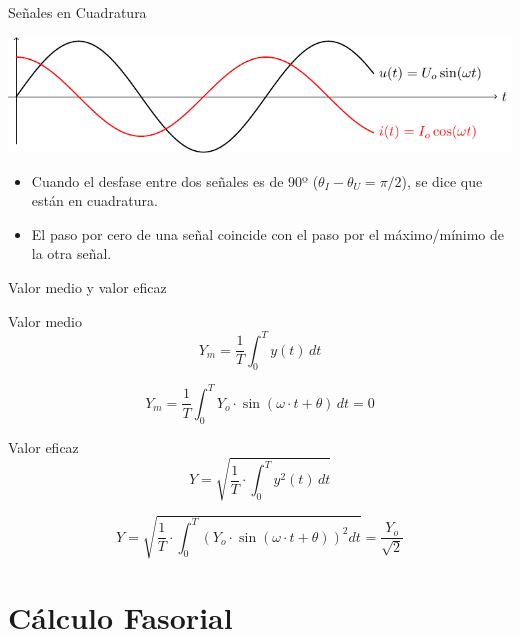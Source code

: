 \documentclass[aspectratio=169, xcolor={usenames,svgnames,dvipsnames}]{beamer}
\begin{document}
\begin{frame}[label={sec:org6f50d8d}]{Señales en Cuadratura}
\begin{center}
\includegraphics[width=.9\linewidth]{figs/cuadratura.pdf}
\end{center}

\begin{itemize}
\item Cuando el desfase entre dos señales es de 90º (\(\theta_I - \theta_U = \pi/2\)), se dice que están en cuadratura.
\item El paso por cero de una señal coincide con el paso por el máximo/mínimo de la otra señal.
\end{itemize}
\end{frame}


\begin{frame}[label={sec:org0064391}]{Valor medio y valor eficaz}
\begin{block}{Valor medio}
\[
Y_m=\frac{1}{T}\int_{0}^{T}y(t)\, dt
\]

\[
Y_m=\frac{1}{T}\int_{0}^{T}Y_{o}\cdot\sin(\omega \cdot t+\theta)\, dt=0
\]
\end{block}
\begin{block}{Valor eficaz}
\[
Y = \sqrt{\frac{1}{T}\cdot\int_{0}^{T}y^{2}(t)\, dt}
\]

\[
Y=\sqrt{\frac{1}{T}\cdot\int_{0}^{T}\left(Y_{o}\cdot\sin(\omega\cdot t+\theta)\right)^{2}dt}=\boxed{\frac{Y_{o}}{\sqrt{2}}}
\]
\end{block}
\end{frame}
\section{Cálculo Fasorial}
\label{sec:org57feae6}
\end{document}
